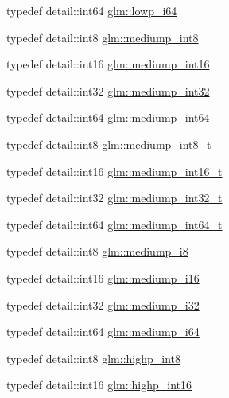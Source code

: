 \begin{DoxyCompactItemize}
\item 
typedef detail\-::int64 \hyperlink{group__gtc__type__precision_ga1f4ded25f71c0f3b4518936d50b54b6e}{glm\-::lowp\-\_\-i64}
\item 
typedef detail\-::int8 \hyperlink{group__gtc__type__precision_ga3ee8faab2278c44c5785af04b7b18a14}{glm\-::mediump\-\_\-int8}
\item 
typedef detail\-::int16 \hyperlink{group__gtc__type__precision_ga4611997edb6c61606daa11990cf08798}{glm\-::mediump\-\_\-int16}
\item 
typedef detail\-::int32 \hyperlink{group__gtc__type__precision_ga0660a752402702f420f13c686a7fff29}{glm\-::mediump\-\_\-int32}
\item 
typedef detail\-::int64 \hyperlink{group__gtc__type__precision_ga603c695fe5cd677d3f72a81343e19a74}{glm\-::mediump\-\_\-int64}
\item 
typedef detail\-::int8 \hyperlink{group__gtc__type__precision_ga626ac5f73d3538e62a879d6c56abfb36}{glm\-::mediump\-\_\-int8\-\_\-t}
\item 
typedef detail\-::int16 \hyperlink{group__gtc__type__precision_ga478fab608cf43040013d719a3e03b194}{glm\-::mediump\-\_\-int16\-\_\-t}
\item 
typedef detail\-::int32 \hyperlink{group__gtc__type__precision_gafd9b4bd9e4465aec63351b59100692c4}{glm\-::mediump\-\_\-int32\-\_\-t}
\item 
typedef detail\-::int64 \hyperlink{group__gtc__type__precision_ga555a2f85641550c232db473a9bb981f7}{glm\-::mediump\-\_\-int64\-\_\-t}
\item 
typedef detail\-::int8 \hyperlink{group__gtc__type__precision_ga28a8b5fd51072680bb55178c17cc7411}{glm\-::mediump\-\_\-i8}
\item 
typedef detail\-::int16 \hyperlink{group__gtc__type__precision_ga8454fc6a82c7bb787d0ac9663e08f63d}{glm\-::mediump\-\_\-i16}
\item 
typedef detail\-::int32 \hyperlink{group__gtc__type__precision_ga5e00ec824eb55968a6b6496f294d8c07}{glm\-::mediump\-\_\-i32}
\item 
typedef detail\-::int64 \hyperlink{group__gtc__type__precision_ga90fedf6c701ffbe00535156715e50787}{glm\-::mediump\-\_\-i64}
\item 
typedef detail\-::int8 \hyperlink{group__gtc__type__precision_ga57c86999e666760c304453f9bfdc09d1}{glm\-::highp\-\_\-int8}
\item 
typedef detail\-::int16 \hyperlink{group__gtc__type__precision_gaf0430ed80e88c0d1dfbe47f359659c81}{glm\-::highp\-\_\-int16}
\item 

\end{DoxyCompactItemize}
